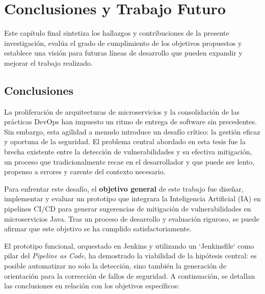 \chapter{Conclusiones y Trabajo Futuro}\label{chap:conclusiones_trabajo_futuro}

Este capítulo final sintetiza los hallazgos y contribuciones de la presente investigación, evalúa el grado de cumplimiento de los objetivos propuestos y establece una visión para futuras líneas de desarrollo que pueden expandir y mejorar el trabajo realizado.

\section{Conclusiones}\label{sec:conclusiones}

La proliferación de arquitecturas de microservicios y la consolidación de las prácticas DevOps han impuesto un ritmo de entrega de software sin precedentes. Sin embargo, esta agilidad a menudo introduce un desafío crítico: la gestión eficaz y oportuna de la seguridad. El problema central abordado en esta tesis fue la brecha existente entre la detección de vulnerabilidades y su efectiva mitigación, un proceso que tradicionalmente recae en el desarrollador y que puede ser lento, propenso a errores y carente del contexto necesario.

Para enfrentar este desafío, el \textbf{objetivo general} de este trabajo fue diseñar, implementar y evaluar un prototipo que integrara la Inteligencia Artificial (IA) en pipelines CI/CD para generar sugerencias de mitigación de vulnerabilidades en microservicios Java. Tras un proceso de desarrollo y evaluación riguroso, se puede afirmar que este objetivo se ha cumplido satisfactoriamente.

El prototipo funcional, orquestado en Jenkins y utilizando un `Jenkinsfile` como pilar del \textit{Pipeline as Code}, ha demostrado la viabilidad de la hipótesis central: es posible automatizar no solo la detección, sino también la generación de orientación para la corrección de fallos de seguridad. A continuación, se detallan las conclusiones en relación con los objetivos específicos:

